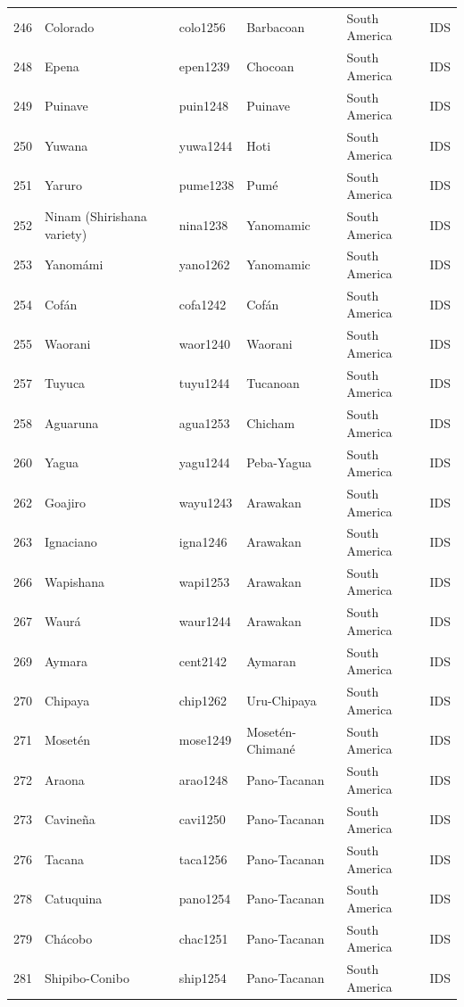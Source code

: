 \begin{table}[ht]
\begin{tabular}{rlllll}
  246 & Colorado & colo1256 & Barbacoan & South America & IDS \\ 
  248 & Epena & epen1239 & Chocoan & South America & IDS \\ 
  249 & Puinave & puin1248 & Puinave & South America & IDS \\ 
  250 & Yuwana & yuwa1244 & Hoti & South America & IDS \\ 
  251 & Yaruro & pume1238 & Pumé & South America & IDS \\ 
  252 & Ninam (Shirishana variety) & nina1238 & Yanomamic & South America & IDS \\ 
  253 & Yanomámi & yano1262 & Yanomamic & South America & IDS \\ 
  254 & Cofán & cofa1242 & Cofán & South America & IDS \\ 
  255 & Waorani & waor1240 & Waorani & South America & IDS \\ 
  257 & Tuyuca & tuyu1244 & Tucanoan & South America & IDS \\ 
  258 & Aguaruna & agua1253 & Chicham & South America & IDS \\ 
  260 & Yagua & yagu1244 & Peba-Yagua & South America & IDS \\ 
  262 & Goajiro & wayu1243 & Arawakan & South America & IDS \\ 
  263 & Ignaciano & igna1246 & Arawakan & South America & IDS \\ 
  266 & Wapishana & wapi1253 & Arawakan & South America & IDS \\ 
  267 & Waurá & waur1244 & Arawakan & South America & IDS \\ 
  269 & Aymara & cent2142 & Aymaran & South America & IDS \\ 
  270 & Chipaya & chip1262 & Uru-Chipaya & South America & IDS \\ 
  271 & Mosetén & mose1249 & Mosetén-Chimané & South America & IDS \\ 
  272 & Araona & arao1248 & Pano-Tacanan & South America & IDS \\ 
  273 & Cavineña & cavi1250 & Pano-Tacanan & South America & IDS \\ 
  276 & Tacana & taca1256 & Pano-Tacanan & South America & IDS \\ 
  278 & Catuquina & pano1254 & Pano-Tacanan & South America & IDS \\ 
  279 & Chácobo & chac1251 & Pano-Tacanan & South America & IDS \\ 
  281 & Shipibo-Conibo & ship1254 & Pano-Tacanan & South America & IDS \\ 

\end{tabular}
\end{table}
